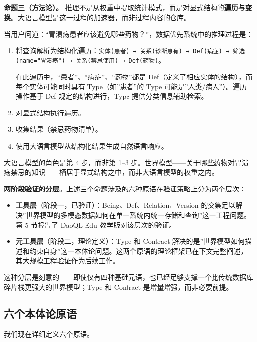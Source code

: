 \documentclass[11pt,a4paper]{ctexart}
\begin{document}
\textbf{命题三（方法论）。}
推理不是从权重中提取统计模式，而是对显式结构的\textbf{遍历与变换}。大语言模型是这一过程的加速器，而非过程内容的仓库。

当用户问道：``胃溃疡患者应该避免哪些药物？''，数据优先系统中的推理过程是：

\begin{enumerate}
\def\labelenumi{\arabic{enumi}.}
\item
  将查询解析为结构化遍历：\texttt{实体(患者)\ →\ 关系(诊断患有)\ →\ Def(病症)\ →\ 筛选(name="胃溃疡")\ →\ 关系(禁忌使用)\ →\ Def(药物)}。

  在此遍历中，``患者''、``病症''、``药物''都是
  Def（定义了相应实体的结构），而每个实体可能同时具有 Type（如''患者''的
  Type 可能是''人类/病人''）。遍历操作基于 Def 规定的结构进行，Type
  提供分类信息辅助检索。
\item
  对显式结构执行遍历。
\item
  收集结果（禁忌药物清单）。
\item
  使用大语言模型从结构化结果生成自然语言响应。
\end{enumerate}

大语言模型的角色是第 4 步，而非第 1--3
步。世界模型------关于哪些药物对胃溃疡禁忌的知识------栖居于显式结构之中，而非大语言模型的权重之内。

\textbf{两阶段验证的分层}。上述三个命题涉及的六种原语在验证策略上分为两个层次：

\begin{itemize}
\tightlist
\item
  \textbf{工具层}（阶段一，已验证）：Being、Def、Relation、Version
  的交集足以解决''世界模型的多模态数据如何在单一系统内统一存储和查询''这一工程问题。第
  5 节报告了 DaoQL-Edu 教学版对该层次的验证。
\item
  \textbf{元工具层}（阶段二，理论定义）：Type 和 Contract
  解决的是''世界模型如何描述和约束自身''这一本体论问题。这两个原语的理论框架已在下文完整阐述，其大规模工程验证作为后续工作。
\end{itemize}

这种分层是刻意的------即使仅有四种基础元语，也已经足够支撑一个比传统数据库碎片栈更强大的世界模型；Type
和 Contract 是增量增强，而非必要前提。

\subsection{六个本体论原语}\label{ux516dux4e2aux672cux4f53ux8bbaux539fux8bed}

我们现在详细定义六个原语。
\end{document}
